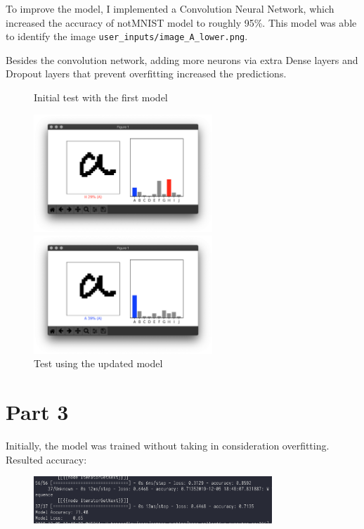 \documentclass{article}
\begin{document}
To improve the model, I implemented a Convolution Neural Network, which increased the accuracy of notMNIST model to roughly 95\%. This model was able to identify the image \texttt{user\_inputs/image\_A\_lower.png}.

Besides the convolution network, adding more neurons via extra Dense layers and Dropout layers that prevent overfitting increased the predictions.

\begin{figure}[t]
  \caption{Initial test with the first model}
  \includegraphics[width=0.6\textwidth]{user_input_a}
  \centering
  \caption{Test using the updated model}
  \includegraphics[width=0.6\textwidth]{user_input_b}
  \centering
\end{figure}

\section*{Part 3}

Initially, the model was trained without taking in consideration overfitting. Resulted accuracy:

\begin{figure}[h!]
  \includegraphics[width=0.8\textwidth]{p32.png}
  \centering
\end{figure}
\end{document}
